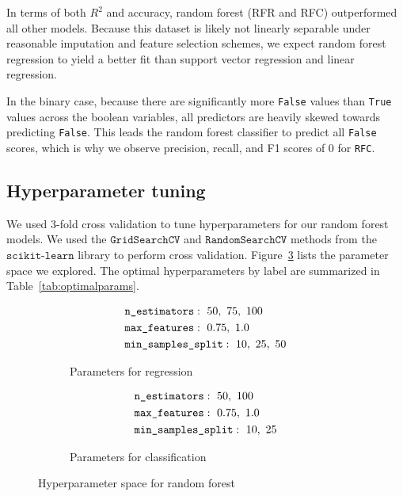 \documentclass{article} %
\begin{document}
In terms of both $R^2$ and accuracy, random forest (RFR and RFC) outperformed all other models. Because this dataset is likely not linearly separable under reasonable imputation and feature selection schemes, we expect random forest regression to yield a better fit than
support vector regression and linear regression.

In the binary case, because there are significantly more \texttt{False} values than \texttt{True} values across the boolean variables, all predictors are heavily skewed towards predicting \texttt{False}. This leads the random forest classifier to predict all \texttt{False} scores, which is why we observe precision, recall, and F1 scores of 0 for \texttt{RFC}.

\subsection{Hyperparameter tuning}
\label{sec:hyperparametertuning}

We used $3$-fold cross validation to tune hyperparameters for our random forest models. We used the $\texttt{GridSearchCV}$ and $\texttt{RandomSearchCV}$ methods from the $\texttt{scikit-learn}$ library to perform cross validation. Figure~\ref{fig:params} lists the parameter space we explored. The optimal hyperparameters by label are summarized in Table~\ref{tab:optimalparams}.

\begin{figure}[H]
  \centering
  \hfill
  \begin{subfigure}[b]{0.35\textwidth}
    \begin{align*}
      &\texttt{n\textunderscore estimators}:~50,~75,~100\\
      &\texttt{max\textunderscore features}:~0.75,~1.0\\
      &\texttt{min\textunderscore samples\textunderscore split}:~10,~25,~50
    \end{align*}
    \caption{Parameters for regression}
    \label{fig:contparams}
  \end{subfigure}
  \hfill
  \begin{subfigure}[b]{0.35\textwidth}
    \begin{align*}
      &\texttt{n\textunderscore estimators}:~50,~100\\
      &\texttt{max\textunderscore features}:~0.75,~1.0\\
      &\texttt{min\textunderscore samples\textunderscore split}:~10,~25
    \end{align*}
    \caption{Parameters for classification}
    \label{fig:boolparams}
  \end{subfigure}
  \caption{Hyperparameter space for random forest}
  \label{fig:params}
  \hfill
\end{figure}
\end{document}
